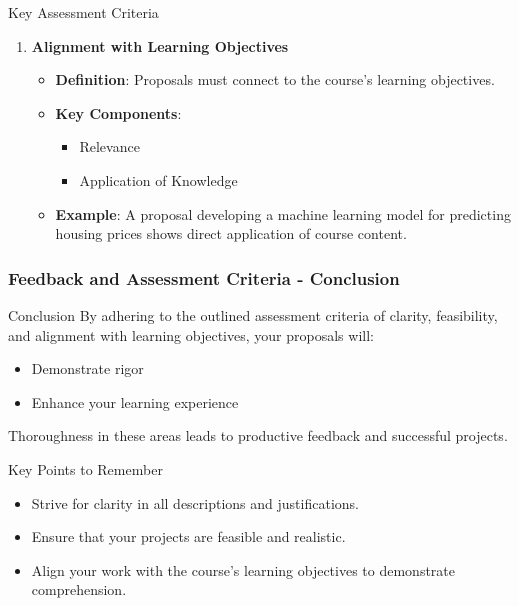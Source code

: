 \documentclass[aspectratio=169]{beamer}
\begin{document}
\begin{frame}[fragile]
\begin{block}{Key Assessment Criteria}
\begin{enumerate}
            \item \textbf{Alignment with Learning Objectives}
                \begin{itemize}
                    \item \textbf{Definition}: Proposals must connect to the course's learning objectives.
                    \item \textbf{Key Components}:
                        \begin{itemize}
                            \item Relevance
                            \item Application of Knowledge
                        \end{itemize}
                    \item \textbf{Example}: A proposal developing a machine learning model for predicting housing prices shows direct application of course content.
                \end{itemize}
        \end{enumerate}
    \end{block}
\end{frame}

\begin{frame}[fragile]
    \frametitle{Feedback and Assessment Criteria - Conclusion}
    \begin{block}{Conclusion}
        By adhering to the outlined assessment criteria of clarity, feasibility, and alignment with learning objectives, your proposals will:
        \begin{itemize}
            \item Demonstrate rigor
            \item Enhance your learning experience
        \end{itemize}
        Thoroughness in these areas leads to productive feedback and successful projects.
    \end{block}

    \begin{block}{Key Points to Remember}
        \begin{itemize}
            \item Strive for clarity in all descriptions and justifications.
            \item Ensure that your projects are feasible and realistic.
            \item Align your work with the course's learning objectives to demonstrate comprehension.
        \end{itemize}
    \end{block}
\end{frame}
\end{document}
